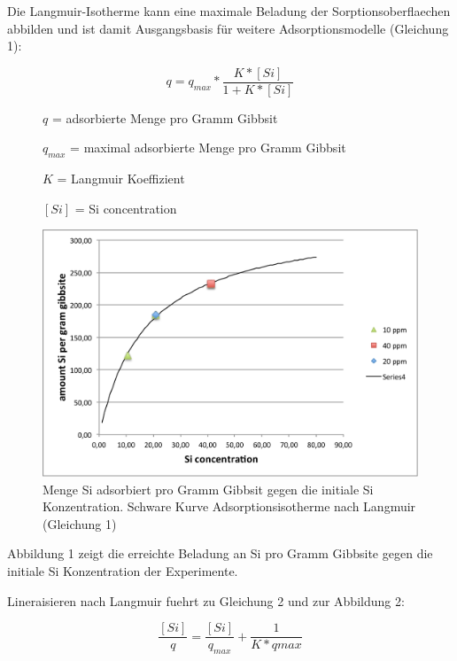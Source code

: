 \documentclass[preprint,review,12pt]{elsarticle}
\begin{document}
Die Langmuir-Isotherme kann eine maximale Beladung der Sorptionsoberflaechen abbilden und ist damit Ausgangsbasis f{\"{u}}r weitere Adsorptionsmodelle (Gleichung 1):


\begin{equation}
q=q_{max}*\frac{K*[Si]}{1+K*[Si]}
\end{equation}


\begin{description}
\item[ ] $q$ = adsorbierte Menge pro Gramm Gibbsit
\item[ ] $q_{max}$ = maximal adsorbierte Menge pro Gramm Gibbsit
\item[ ]$K$ = Langmuir Koeffizient	
\item[ ]$[Si]$ = Si concentration
\end{description}


\begin{figure}[h!]
\begin{center}
\includegraphics[width=0.7\columnwidth]{figures/langmuir_fig/langmuir_fig.png}
\caption{Menge Si adsorbiert pro Gramm Gibbsit gegen die initiale Si Konzentration. Schware Kurve Adsorptionsisotherme nach Langmuir (Gleichung 1)}
\end{center}
\end{figure}

Abbildung 1 zeigt die erreichte Beladung an Si pro Gramm Gibbsite gegen die initiale Si Konzentration der Experimente.


Lineraisieren nach Langmuir fuehrt zu Gleichung 2 und zur Abbildung 2:


\begin{equation}
\frac{[Si]}{q}=\frac{[Si]}{q_{max}}+\frac{1}{K*q{max}}
\end{equation}
\end{document}
